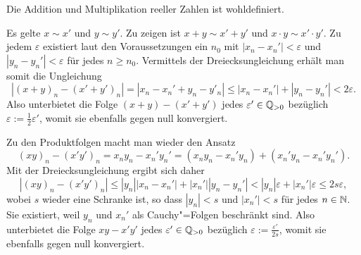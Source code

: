 \begin{Satz}
Die Addition und Multiplikation reeller Zahlen ist wohldefiniert.
\end{Satz}
\begin{Beweis}
Es gelte $x\sim x'$ und $y\sim y'$. Zu zeigen ist $x+y\sim x'+y'$
und $x\cdot y\sim x'\cdot y'$. Zu jedem $\varepsilon$ existiert laut
den Voraussetzungen ein $n_0$ mit $|x_n-x_n'| < \varepsilon$
und $|y_n-y_n'|<\varepsilon$ für jedes $n\ge n_0$. Vermittels der
Dreiecksungleichung erhält man somit die Ungleichung
\[|(x+y)_n - (x'+y')_n| = |x_n-x_n' + y_n-y'_n|
\le |x_n-x_n'| + |y_n-y_n'| < 2\varepsilon.\]
Also unterbietet die Folge $(x+y)-(x'+y')$ jedes $\varepsilon'\in\mathbb Q_{>0}$
bezüglich $\varepsilon:=\tfrac{1}{2}\varepsilon'$, womit sie ebenfalls
gegen null konvergiert.

Zu den Produktfolgen macht man wieder den Ansatz
\[(xy)_n - (x'y')_n = x_n y_n - x_n' y_n' = (x_n y_n - x_n' y_n) + (x_n' y_n - x_n' y_n').\]
Mit der Dreiecksungleichung ergibt sich daher
\[|(xy)_n - (x'y')_n| \le |y_n||x_n-x_n'| + |x_n'||y_n-y_n'|
< |y_n|\varepsilon + |x_n'|\varepsilon \le 2s\varepsilon,\]
wobei $s$ wieder eine Schranke ist, so dass $|y_n|<s$ und $|x_n'|<s$ für jedes $n\in\mathbb N$.
Sie existiert, weil $y_n$ und $x_n'$ als Cauchy"=Folgen beschränkt sind.
Also unterbietet die Folge $xy-x'y'$ jedes $\varepsilon'\in\mathbb Q_{>0}$
bezüglich $\varepsilon:=\tfrac{\varepsilon'}{2s}$, womit sie ebenfalls
gegen null konvergiert.\,\qedsymbol
\end{Beweis}
